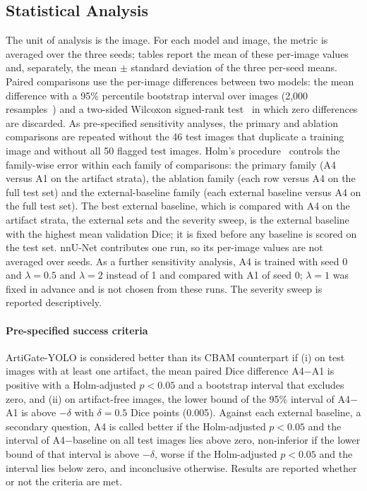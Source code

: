 \subsection{Statistical Analysis}\label{sec:stats}
The unit of analysis is the image. For each model and image, the metric is averaged over the three seeds; tables report the mean of these per-image values and, separately, the mean $\pm$ standard deviation of the three per-seed means. Paired comparisons use the per-image differences between two models: the mean difference with a 95\% percentile bootstrap interval over images (2,000 resamples~\cite{efron1993bootstrap}) and a two-sided Wilcoxon signed-rank test~\cite{wilcoxon1945} in which zero differences are discarded. As pre-specified sensitivity analyses, the primary and ablation comparisons are repeated without the 46 test images that duplicate a training image and without all 50 flagged test images. Holm's procedure~\cite{holm1979} controls the family-wise error within each family of comparisons: the primary family (A4 versus A1 on the artifact strata), the ablation family (each row versus A4 on the full test set) and the external-baseline family (each external baseline versus A4 on the full test set). The best external baseline, which is compared with A4 on the artifact strata, the external sets and the severity sweep, is the external baseline with the highest mean validation Dice; it is fixed before any baseline is scored on the test set. nnU-Net contributes one run, so its per-image values are not averaged over seeds. As a further sensitivity analysis, A4 is trained with seed 0 and $\lambda=0.5$ and $\lambda=2$ instead of 1 and compared with A1 of seed 0; $\lambda=1$ was fixed in advance and is not chosen from these runs. The severity sweep is reported descriptively.

\paragraph{Pre-specified success criteria}
ArtiGate-YOLO is considered better than its CBAM counterpart if (i) on test images with at least one artifact, the mean paired Dice difference A4$-$A1 is positive with a Holm-adjusted $p<0.05$ and a bootstrap interval that excludes zero, and (ii) on artifact-free images, the lower bound of the 95\% interval of A4$-$A1 is above $-\delta$ with $\delta=0.5$ Dice points (0.005). Against each external baseline, a secondary question, A4 is called better if the Holm-adjusted $p<0.05$ and the interval of A4$-$baseline on all test images lies above zero, non-inferior if the lower bound of that interval is above $-\delta$, worse if the Holm-adjusted $p<0.05$ and the interval lies below zero, and inconclusive otherwise. Results are reported whether or not the criteria are met.
